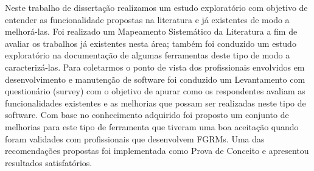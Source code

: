 Neste trabalho de dissertação realizamos um estudo exploratório com objetivo de
entender as funcionalidade propostas na literatura e já existentes de modo a
melhorá-las. Foi realizado um Mapeamento Sistemático da Literatura a fim de
avaliar os trabalhos já existentes nesta área; também foi conduzido um estudo
exploratório na documentação de algumas ferramentas deste tipo de modo a
caracterizá-las. Para coletarmos o ponto de vista dos profissionais envolvidos
em desenvolvimento e manutenção de software foi conduzido um Levantamento com
questionário (survey) com o objetivo de apurar como os respondentes  avaliam as
funcionalidades existentes e as melhorias que possam ser realizadas neste tipo
de software. Com base no conhecimento adquirido foi proposto um conjunto de
melhorias para este tipo de ferramenta que tiveram uma boa aceitação quando
foram validades com profissionais que desenvolvem FGRMs. Uma das recomendações
propostas foi implementada como Prova de Conceito e apresentou resultados
satisfatórios.

